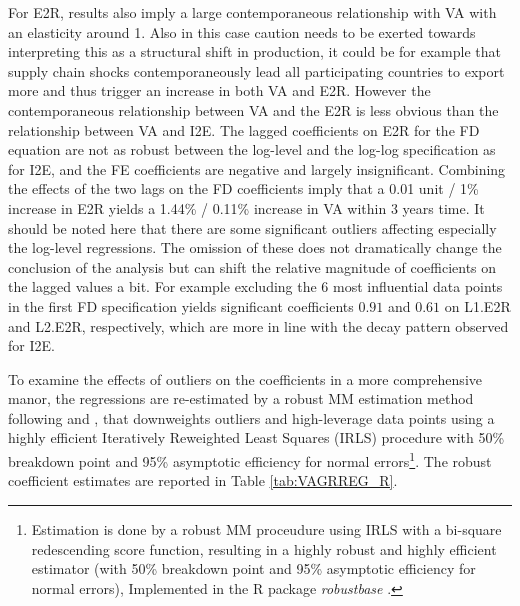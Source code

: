 \documentclass[a4paper]{article}
\begin{document}


For E2R, results also imply a large contemporaneous relationship with VA with an elasticity around 1. Also in this case caution needs to be exerted towards interpreting this as a structural shift in production, it could be for example that supply chain shocks contemporaneously lead all participating countries to export more and thus trigger an increase in both VA and E2R. However the contemporaneous relationship between VA and the E2R is less obvious than the relationship between VA and I2E. The lagged coefficients on E2R for the FD equation are not as robust between the log-level and the log-log specification as for I2E, and the FE coefficients are negative and largely insignificant. Combining the effects of the two lags on the FD coefficients imply that a 0.01 unit / 1\% increase in E2R yields a  1.44\% / 0.11\% increase in VA within 3 years time. It should be noted here that there are some significant outliers affecting especially the log-level regressions. The omission of these does not dramatically change the conclusion of the analysis but can shift the relative magnitude of coefficients on the lagged values a bit. For example excluding the 6 most influential data points in the first FD specification yields significant coefficients $0.91$ and $0.61$ on L1.E2R and L2.E2R, respectively, which are more in line with the decay pattern observed for I2E. \newline 

To examine the effects of outliers on the coefficients in a more comprehensive manor, the regressions are re-estimated by a robust MM estimation method following \citet{yohai1987high} and \citet{koller2011sharpening}, that downweights outliers and high-leverage data points using a highly efficient Iteratively Reweighted Least Squares (IRLS) procedure with 50\% breakdown point and 95\% asymptotic efficiency for normal errors\footnote{Estimation is done by a robust MM proceudure using IRLS with a bi-square redescending score function, resulting in a highly robust and highly efficient estimator (with 50\% breakdown point and 95\% asymptotic efficiency for normal errors), Implemented in the R package \textit{robustbase} \citep{rousseeuw2009robustbase}.}. The robust coefficient estimates are reported in Table \ref{tab:VAGRREG_R}. 
\end{document}
